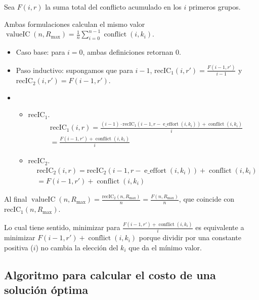 Sea $F(i,r)$ la suma total del conflicto acumulado en los $i$ primeros grupos.

Ambas formulaciones calculan el mismo valor $\operatorname{ valueIC }(n,R_{ \max }) = \frac{ 1 }{ n } \sum_{ i = 0 }^{ n - 1 } \operatorname{ conflict }(i,k_i)$.

\begin{itemize}
	\item Caso base: para $i = 0$, ambas definiciones retornan $0$.

	\item Paso inductivo: supongamos que para $i - 1$, $\operatorname{ { recIC }_1 }(i,r') = \frac{ F(i - 1,r') }{ i - 1 }$ y $\operatorname{ { recIC }_2 }(i,r') =F(i - 1,r')$.

	\item \begin{itemize}
			\item $\operatorname{ { recIC }_1 }$.
			\begin{align}
				& \operatorname{ { recIC }_1 }(i,r) = \frac{ (i - 1) \cdot \operatorname{ { recIC }_1 }(i - 1,r - \operatorname{ e\_effort }(i,k_i)) + \operatorname{ conflict }(i,k_i) }{ i } \\
				& = \frac{ F(i - 1,r') + \operatorname{ conflict }(i,k_i) }{ i }
			\end{align}
			\item $\operatorname{ { recIC }_2 }$.
			\begin{align}
				& \operatorname{ { recIC }_2 }(i,r) = \operatorname{ { recIC }_2 }(i - 1,r - \operatorname{ e\_effort }(i,k_i)) + \operatorname{ conflict }(i,k_i) \\
				& = F(i - 1,r') + \operatorname{ conflict }(i,k_i)
			\end{align}
		\end{itemize}
\end{itemize}

Al final $\operatorname{ valueIC }(n,R_{ \max }) = \frac{ \operatorname{ { recIC }_2 }(n,R_{ \max }) }{ n } = \frac{ F(n,R_{ \max }) }{ n }$, que coincide con $\operatorname{ { recIC }_1 }(n,R_{ \max })$.

Lo cual tiene sentido, minimizar para $\frac{ F(i - 1,r') + \operatorname{ conflict }(i,k_i) }{ i }$ es equivalente a minimizar $F(i - 1,r') + \operatorname{ conflict }(i,k_i)$ porque dividir por una constante positiva ($i$) no cambia la elección del $k_i$ que da el mínimo valor.

\subsection{Algoritmo para calcular el costo de una solución óptima}


